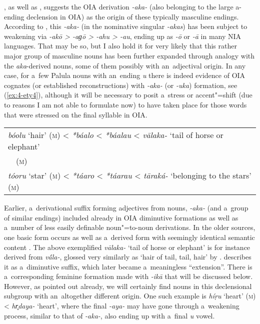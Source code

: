 \citet[15]{morgenstierne1941}, as well as \citet[29]{buddruss1967}, suggests the OIA derivation \textit{-aka-} (also belonging to the large a-ending declension in OIA) as the origin of these typically masculine endings. According to \citet[222]{masica1991}, this \textit{-aka-} (in the nominative singular \textit{-akas}) has been subject to weakening via \textit{-akō {\textgreater} -aɡō {\textgreater} -ahu {\textgreater} -au}, ending up as \textit{-ō} or \textit{-\={a}} in many NIA languages. That may be so, but I also hold it for very likely that this rather major group of masculine nouns has been further expanded through analogy with the \textit{aka}-derived nouns, some of them possibly with an~adjectival origin. In any case, for a~few Palula nouns with an~ending \textit{u} there is indeed evidence of OIA cognates (or established reconstructions) with \textit{-aka-} (or \textit{-uka}) formation, see (\ref{ex:4-ety4}), although it will be necessary to posit a~stress or accent"=shift (due to reasons I am not able to formulate now) to have taken place for those words that were stressed on the final syllable in OIA. 


\begin{exe}
\extab
\label{ex:4-ety4}
\begin{tabular}{ l }
\textit{bóolu} `hair' (\textsc{m}) {\textless} \textit{*báalo} {\textless} \textit{*báalau} {\textless} \textit{vālaka-} `tail of horse or elephant'\\
~~(\textsc{m})\\
\textit{tóoru} `star' (\textsc{m}) {\textless} \textit{*táaro} {\textless} \textit{*táarau} {\textless} \textit{tāraká-} `belonging to the stars' (\textsc{m})
\end{tabular}
\end{exe}


Earlier, a~derivational suffix forming adjectives from nouns, \textit{-aka-} (and a~group of similar endings) included already in OIA diminutive formations as well as a~number of less easily definable noun"=to-noun derivations. In the older sources, one basic form occurs as well as a~derived form with seemingly identical semantic content \citep[1222]{whitney1960}. The above exemplified \textit{vālaka-} `tail of horse or elephant' is for instance derived from \textit{v\'{\={a}}la-}, glossed very similarly as `hair of tail, tail, hair' by \citet[12056]{turner1966}. \citet[222]{masica1991} describes it as a~diminutive suffix, which later became a~meaningless ``extension''. There is a~corresponding \citep[1181, 1222]{whitney1960} feminine formation made with \textit{-ikā} that will be discussed below. However, as pointed out already, we will certainly find nouns in this declensional subgroup with an~altogether different origin. One such example is \textit{híṛu} `heart' (\textsc{m}) {\textless} \textit{hr̥daya-} `heart', where the final \textit{-aya-} may have gone through a~weakening process, similar to that of \textit{-aka-}, also ending up with a~final \textit{u} vowel.


